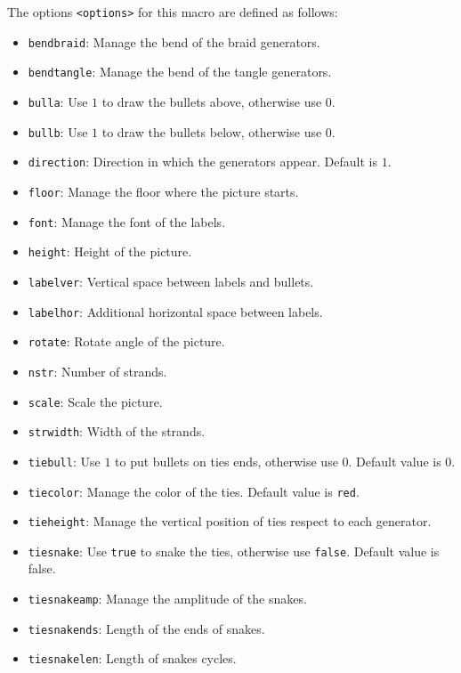 \documentclass[reqno]{../../../Projects/LaTeX/gtpart}
\numberwithin{equation}{section}
\begin{document}
The options \texttt{<options>} for this macro are defined as follows:
\begin{itemize}
\item \texttt{bendbraid}: Manage the bend of the braid generators.
\item \texttt{bendtangle}: Manage the bend of the tangle generators.
\item \texttt{bulla}: Use $1$ to draw the bullets above, otherwise use $0$.
\item \texttt{bullb}: Use $1$ to draw the bullets below, otherwise use $0$.
\item \texttt{direction}: Direction in which the generators appear. Default is $1$.
\item \texttt{floor}: Manage the floor where the picture starts.
\item \texttt{font}: Manage the font of the labels.
\item \texttt{height}: Height of the picture.
\item \texttt{labelver}: Vertical space between labels and bullets.
\item \texttt{labelhor}: Additional horizontal space between labels.
\item \texttt{rotate}: Rotate angle of the picture.
\item \texttt{nstr}: Number of strands.
\item \texttt{scale}: Scale the picture.
\item \texttt{strwidth}: Width of the strands.
\item \texttt{tiebull}: Use $1$ to put bullets on ties ends, otherwise use $0$. Default value is $0$.
\item \texttt{tiecolor}: Manage the color of the ties. Default value is \texttt{red}.
\item \texttt{tieheight}: Manage the vertical position of ties respect to each generator.
\item \texttt{tiesnake}: Use \texttt{true} to snake the ties, otherwise use \texttt{false}. Default value is false.
\item \texttt{tiesnakeamp}: Manage the amplitude of the snakes.
\item \texttt{tiesnakends}: Length of the ends of snakes.
\item \texttt{tiesnakelen}: Length of snakes cycles.

\end{itemize}
\end{document}
